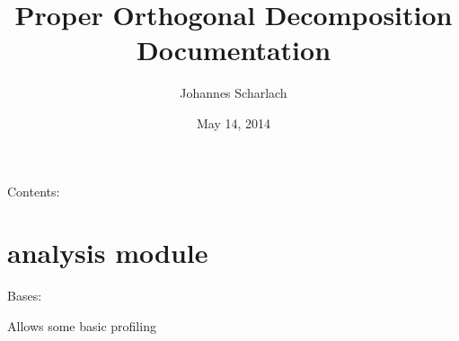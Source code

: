 \documentclass[letterpaper,10pt,english]{sphinxmanual}
\title{Proper Orthogonal Decomposition Documentation}
\date{May 14, 2014}
\author{Johannes Scharlach}
\begin{document}
\maketitle
\tableofcontents
{}\label{index::doc}


Contents:


\chapter{analysis module}
\label{analysis:analysis-module}\label{analysis:module-analysis}\label{analysis::doc}\label{analysis:welcome-to-s-documentation}

\begin{fulllineitems}
\label{analysis:analysis.Timer}
Bases: 

Allows some basic profiling

\end{fulllineitems}


\begin{fulllineitems}
\label{analysis:analysis.plotResults}
\end{fulllineitems}


\begin{fulllineitems}
\label{analysis:analysis.randomRuns}
\end{fulllineitems}


\begin{fulllineitems}
\label{analysis:analysis.runAnalysis}
\end{fulllineitems}


\begin{fulllineitems}
\label{analysis:analysis.x0}
\end{fulllineitems}
\end{document}

